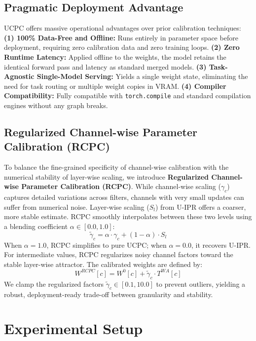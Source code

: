\documentclass{article}
\theoremstyle{plain}
\theoremstyle{definition}
\theoremstyle{remark}
\begin{document}
\subsection{Pragmatic Deployment Advantage}
UCPC offers massive operational advantages over prior calibration techniques:
\textbf{(1) 100\% Data-Free and Offline:} Runs entirely in parameter space before deployment, requiring zero calibration data and zero training loops.
\textbf{(2) Zero Runtime Latency:} Applied offline to the weights, the model retains the identical forward pass and latency as standard merged models.
\textbf{(3) Task-Agnostic Single-Model Serving:} Yields a single weight state, eliminating the need for task routing or multiple weight copies in VRAM.
\textbf{(4) Compiler Compatibility:} Fully compatible with \texttt{torch.compile} and standard compilation engines without any graph breaks.

\subsection{Regularized Channel-wise Parameter Calibration (RCPC)}
To balance the fine-grained specificity of channel-wise calibration with the numerical stability of layer-wise scaling, we introduce \textbf{Regularized Channel-wise Parameter Calibration (RCPC)}.
While channel-wise scaling ($\gamma_c$) captures detailed variations across filters, channels with very small updates can suffer from numerical noise. Layer-wise scaling ($S_l$) from U-IPR offers a coarser, more stable estimate.
RCPC smoothly interpolates between these two levels using a blending coefficient $\alpha \in [0.0, 1.0]$:
\begin{equation}
  \tilde{\gamma}_c = \alpha \cdot \gamma_c + (1 - \alpha) \cdot S_l
\end{equation}
When $\alpha=1.0$, RCPC simplifies to pure UCPC; when $\alpha=0.0$, it recovers U-IPR. For intermediate values, RCPC regularizes noisy channel factors toward the stable layer-wise attractor. The calibrated weights are defined by:
\begin{equation}
  W^{RCPC}[c] = W^0[c] + \tilde{\gamma}_c \cdot T^{WA}[c]
\end{equation}
We clamp the regularized factors $\tilde{\gamma}_c \in [0.1, 10.0]$ to prevent outliers, yielding a robust, deployment-ready trade-off between granularity and stability.

\section{Experimental Setup}
\label{sec:experiments}
\end{document}
